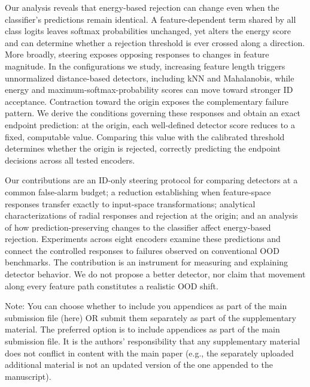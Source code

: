 \documentclass[twoside]{article}
\begin{document}
Our analysis reveals that energy-based rejection can change even when the classifier’s predictions remain identical. A feature-dependent term shared by all class logits leaves softmax probabilities unchanged, yet alters the energy score and can determine whether a rejection threshold is ever crossed along a direction. More broadly, steering exposes opposing responses to changes in feature magnitude. In the configurations we study, increasing feature length triggers unnormalized distance-based detectors, including kNN and Mahalanobis, while energy and maximum-softmax-probability scores can move toward stronger ID acceptance. Contraction toward the origin exposes the complementary failure pattern. We derive the conditions governing these responses and obtain an exact endpoint prediction: at the origin, each well-defined detector score reduces to a fixed, computable value. Comparing this value with the calibrated threshold determines whether the origin is rejected, correctly predicting the endpoint decisions across all tested encoders.

Our contributions are an ID-only steering protocol for comparing detectors at a common false-alarm budget; a reduction establishing when feature-space responses transfer exactly to input-space transformations; analytical characterizations of radial responses and rejection at the origin; and an analysis of how prediction-preserving changes to the classifier affect energy-based rejection. Experiments across eight encoders examine these predictions and connect the controlled responses to failures observed on conventional OOD benchmarks. The contribution is an instrument for measuring and explaining detector behavior. We do not propose a better detector, nor claim that movement along every feature path constitutes a realistic OOD shift.


\clearpage
\appendix
\thispagestyle{empty}

\onecolumn
{}

Note: You can choose whether to include you appendices as part of the main submission file (here) OR submit them separately as part of the supplementary material. The preferred option is to include appendices as part of the main submission file. It is the authors' responsibility that any supplementary material does not conflict in content with the main paper (e.g., the separately uploaded additional material is not an updated version of the one appended to the manuscript).
\end{document}
